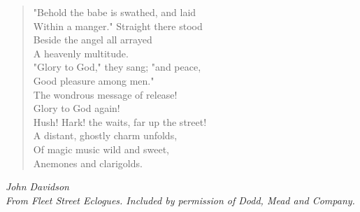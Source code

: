 \begin{verse}
"Behold the babe is swathed, and laid\\
\hspace*{2em}Within a manger." Straight there stood\\
Beside the angel all arrayed\\
\hspace*{2em}A heavenly multitude.\\[0.7em]

"Glory to God," they sang; "and peace,\\
\hspace*{2em}Good pleasure among men."\\
The wondrous message of release!\\
\hspace*{2em}Glory to God again!\\[0.7em]

Hush! Hark! the waits, far up the street!\\
\hspace*{2em}A distant, ghostly charm unfolds,\\
Of magic music wild and sweet,\\
\hspace*{2em}Anemones and clarigolds.%
\end{verse}

\vspace{0.5\baselineskip}
\noindent\textit{John Davidson}\\
\noindent\textit{From \emph{Fleet Street Eclogues.} Included by permission of Dodd, Mead and Company.}

\newpage
